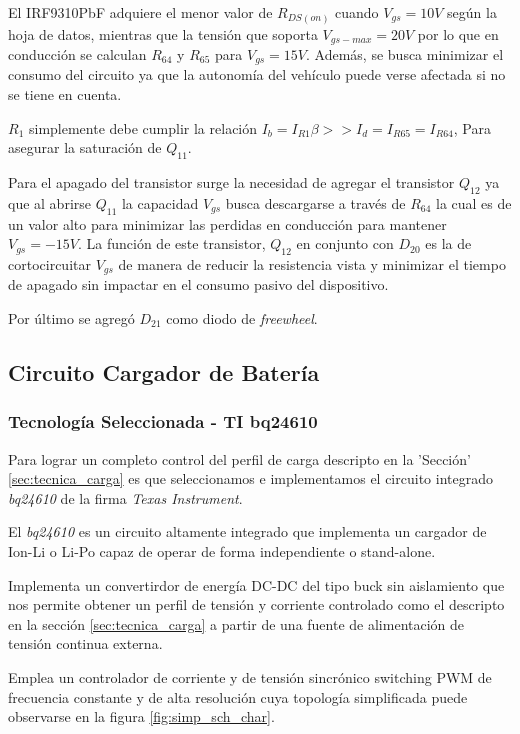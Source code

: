 \documentclass[10pt,a4paper]{article}
\begin{document}
El IRF9310PbF adquiere el menor valor de $R_{DS(on)}$ cuando $V_{gs} = 10V$
según la hoja de datos\cite{IRF9310}, mientras que la tensión que soporta
$V_{gs-max}=20V$ por lo que en conducción se calculan $R_{64}$ y $R_{65}$ para
$V_{gs}=15V$.
Además, se busca minimizar el consumo del circuito ya que la autonomía del
vehículo puede verse afectada si no se tiene en cuenta.

$R_1$ simplemente debe cumplir la relación $I_b = I_{R1} \beta >> I_d = I_{R65}
= I_{R64}$, Para asegurar la saturación de $Q_{11}$. 

Para el apagado del transistor surge la necesidad de agregar el transistor
$Q_{12}$ ya que al abrirse $Q_{11}$ la capacidad $V_{gs}$ busca descargarse a
través de $R_{64}$ la cual es de un valor alto para minimizar las perdidas en
conducción para mantener $V_{gs}=-15V$. La función de este transistor, $Q_{12}$
en conjunto con $D_{20}$ es la de cortocircuitar $V_{gs}$ de manera de reducir
la resistencia vista y minimizar el tiempo de apagado sin impactar en el consumo
pasivo del dispositivo.

Por último se agregó $D_{21}$ como diodo de \emph{freewheel}.

\subsection{Circuito Cargador de Batería}

\subsubsection{Tecnología Seleccionada - TI bq24610}

Para lograr un completo control del perfil de carga descripto en la 'Sección'
\ref{sec:tecnica_carga}  es que seleccionamos e implementamos el circuito
integrado \emph{bq24610} de la firma \emph{Texas Instrument}.

El \emph{bq24610} es un circuito altamente integrado que implementa un cargador
de \acrfull{Ion-Li} o \acrfull{Li-Po} capaz de operar de forma independiente o
stand-alone.

Implementa un convertirdor de energía DC-DC del tipo buck sin aislamiento que
nos permite obtener un perfil de tensión y corriente controlado como el
descripto en la sección \ref{sec:tecnica_carga} a partir de una fuente de
alimentación de tensión continua externa.

Emplea un controlador de corriente y de tensión sincrónico
switching PWM de frecuencia constante y de alta resolución cuya
topología simplificada puede observarse en la figura \ref{fig:simp_sch_char}. 
\end{document}
